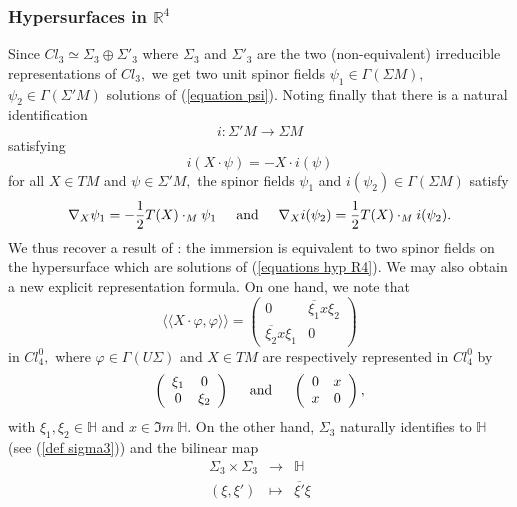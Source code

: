 \documentclass{amsart}
\begin{document}
\subsubsection{Hypersurfaces in ${\mathbb{R}}^4$} Since $Cl_3\simeq\Sigma_3\oplus\Sigma'_3$ where $\Sigma_3$ and $\Sigma'_3$ are the two (non-equivalent) irreducible representations of $Cl_3,$ we get two unit spinor fields $\psi_1\in \Gamma(\Sigma M),$ $\psi_2\in \Gamma(\Sigma' M)$ solutions of (\ref{equation psi}). Noting finally that there is a natural identification
$$i:\Sigma' M\rightarrow\Sigma M$$
satisfying 
$$i(X\cdot \psi)=-X\cdot i(\psi)$$
for all $X\in TM$ and $\psi\in\Sigma'M,$ the spinor fields $\psi_1$ and $i(\psi_2)\in\Gamma(\Sigma M)$ satisfy  
\begin{equation}\label{equations hyp R4}
\nabla_X\psi_1=-\frac{1}{2}T(X)\cdot_M\psi_1\hspace{.5cm} \mbox{and}\hspace{.5cm} \nabla_Xi(\psi_2)=\frac{1}{2}T(X)\cdot_Mi(\psi_2).
\end{equation}
We thus recover a result of \cite{LR1}: the immersion is equivalent to two spinor fields on the hypersurface which are solutions of (\ref{equations hyp R4}). We may also obtain a new explicit representation formula. On one hand, we note that
\begin{equation}\label{ident1 hyp R4}
\langle\langle X\cdot\varphi,\varphi\rangle\rangle=\left(\begin{array}{cc}0&\overline{\xi_1}x\xi_2\\ \overline{\xi_2}x\xi_1&0\end{array}\right)
\end{equation}
in $Cl^0_4,$ where $\varphi\in\Gamma(U\Sigma)$ and $X\in TM$ are respectively represented in $Cl_4^0$ by 
$$\left(\begin{array}{cc}\xi_1&0\\0&\xi_2\end{array}\right)\hspace{.5cm}\mbox{and}\hspace{.5cm}\left(\begin{array}{cc}0&x\\x&0\end{array}\right),$$
with $\xi_1,\xi_2\in{\mathbb{H}}$ and $x\in\Im m\ {\mathbb{H}}.$ On the other hand, $\Sigma_3$ naturally identifies to ${\mathbb{H}}$ (see (\ref{def sigma3})) and the bilinear map 
\begin{eqnarray*}
\Sigma_3\times \Sigma_3&\rightarrow&{\mathbb{H}}\\
(\xi,\xi')&\mapsto&\overline{\xi'}\xi
\end{eqnarray*}
\end{document}
